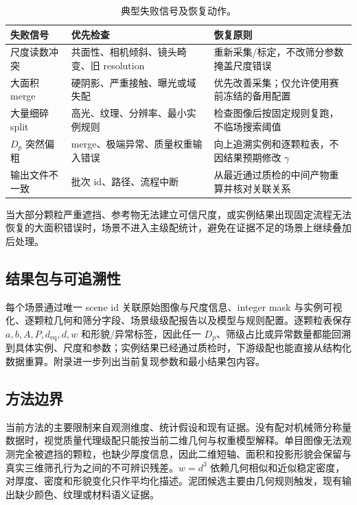 \begin{table}[H]
\centering
\caption{典型失败信号及恢复动作。}
\label{tab:r-recovery}
\footnotesize
\renewcommand{\arraystretch}{1.1}
\begin{tabular}{>{\raggedright\arraybackslash}p{3.0cm}>{\raggedright\arraybackslash}p{6.5cm}>{\raggedright\arraybackslash}p{7.0cm}}
\toprule
失败信号 & 优先检查 & 恢复原则 \\
\midrule
尺度读数冲突 & 共面性、相机倾斜、镜头畸变、旧 resolution & 重新采集/标定，不改筛分参数掩盖尺度错误 \\
大面积 merge & 硬阴影、严重接触、曝光或域失配 & 优先改善采集；仅允许使用赛前冻结的备用配置 \\
大量细碎 split & 高光、纹理、分辨率、最小实例规则 & 检查图像后按固定规则复跑，不临场搜索阈值 \\
$D_p$ 突然偏粗 & merge、极端异常、质量权重输入错误 & 向上追溯实例和逐颗粒表，不因结果预期修改 $\gamma$ \\
输出文件不一致 & 批次 id、路径、流程中断 & 从最近通过质检的中间产物重算并核对关联关系 \\
\bottomrule
\end{tabular}
\end{table}

当大部分颗粒严重遮挡、参考物无法建立可信尺度，或实例结果出现固定流程无法恢复的大面积错误时，场景不进入主级配统计，避免在证据不足的场景上继续叠加后处理。

\subsection{结果包与可追溯性}

每个场景通过唯一 scene id 关联原始图像与尺度信息、integer mask 与实例可视化、逐颗粒几何和筛分字段、场景级级配报告以及模型与规则配置。逐颗粒表保存 $a,b,A,P,d_{\mathrm{eq}},d,w$ 和形貌/异常标签，因此任一 $D_p$、筛级占比或异常数量都能回溯到具体实例、尺度和参数；实例结果已经通过质检时，下游级配也能直接从结构化数据重算。附录进一步列出当前复现参数和最小结果包内容。

\subsection{方法边界}

当前方法的主要限制来自观测维度、统计假设和现有证据。没有配对机械筛分称量数据时，视觉质量代理级配只能按当前二维几何与权重模型解释。单目图像无法观测完全被遮挡的颗粒，也缺少厚度信息，因此二维短轴、面积和投影形貌会保留与真实三维筛孔行为之间的不可辨识残差。$w=d^3$ 依赖几何相似和近似稳定密度，对厚度、密度和形貌变化只作平均化描述。泥团候选主要由几何规则触发，现有输出缺少颜色、纹理或材料语义证据。

